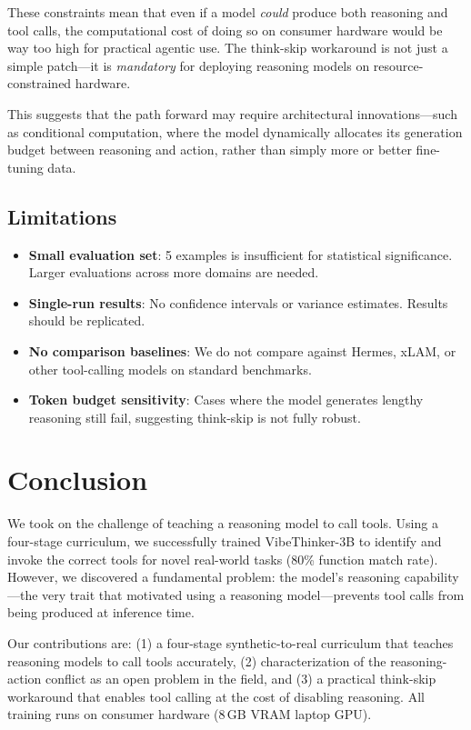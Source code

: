 \documentclass[conference]{IEEEtran}
\begin{document}
These constraints mean that even if a model \textit{could} produce both reasoning and tool calls, the computational cost of doing so on consumer hardware would be way too high for practical agentic use. The think-skip workaround is not just a simple patch---it is \textit{mandatory} for deploying reasoning models on resource-constrained hardware.

This suggests that the path forward may require architectural innovations---such as conditional computation, where the model dynamically allocates its generation budget between reasoning and action, rather than simply more or better fine-tuning data.

\subsection{Limitations}
\begin{itemize}
\item \textbf{Small evaluation set}: 5 examples is insufficient for statistical significance. Larger evaluations across more domains are needed.
\item \textbf{Single-run results}: No confidence intervals or variance estimates. Results should be replicated.
\item \textbf{No comparison baselines}: We do not compare against Hermes, xLAM, or other tool-calling models on standard benchmarks.
\item \textbf{Token budget sensitivity}: Cases where the model generates lengthy reasoning still fail, suggesting think-skip is not fully robust.
\end{itemize}

\section{Conclusion}
\label{sec:conclusion}

We took on the challenge of teaching a reasoning model to call tools. Using a four-stage curriculum, we successfully trained VibeThinker-3B to identify and invoke the correct tools for novel real-world tasks (80\% function match rate). However, we discovered a fundamental problem: the model's reasoning capability---the very trait that motivated using a reasoning model---prevents tool calls from being produced at inference time.

Our contributions are: (1) a four-stage synthetic-to-real curriculum that teaches reasoning models to call tools accurately, (2) characterization of the reasoning-action conflict as an open problem in the field, and (3) a practical think-skip workaround that enables tool calling at the cost of disabling reasoning. All training runs on consumer hardware (8\,GB VRAM laptop GPU).
\end{document}
